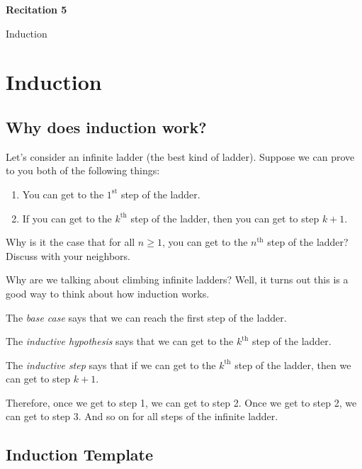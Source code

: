 \documentclass[12pt,letterpaper]{article}
\begin{document}
  \thispagestyle{firstpagestyle}
  \begin{center}
    {\large \textbf{Recitation 5}}
    
    {\large Induction}
  \end{center}
 
 
\section*{Induction}
 
 \subsection*{Why does induction work?}
 
 Let's consider an infinite ladder (the best kind of ladder). Suppose we can prove to you both of the following things:
 
 \begin{enumerate}
 \item You can get to the $1^{\text{st}}$ step of the ladder.
 \item If you can get to the $k^{\text{th}}$ step of the ladder, then you can get to step $k+1$.
 \end{enumerate}
 
Why is it the case that for all $n \geq 1$, you can get to the $n^{\text{th}}$ step of the ladder? Discuss with your neighbors.

\begin{mdframed} \vspace{1.5cm} \end{mdframed}
 
 Why are we talking about climbing infinite ladders? Well, it turns out this is a good way to think about how induction works. 

	The \textit{base case} says that we can reach the first step of the ladder.

	The \textit{inductive hypothesis} says that we can get to the $k^{\text{th}}$ step of the ladder.

	The \textit{inductive step} says that if we can get to the $k^{\text{th}}$ step of the ladder, then we can get to step $k+1$. 

	Therefore, once we get to step 1, we can get to step 2. Once we get to step 2, we can get to step 3. And so on for all steps of the infinite ladder.
 
 \subsection*{Induction Template}
 
\end{document}
